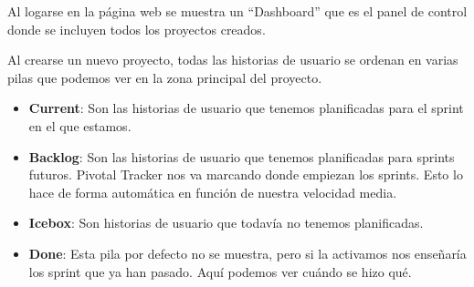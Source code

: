 \documentclass[a4paper, 12pt]{book}
\begin{document}
Al logarse en la p\'agina web se muestra un ``Dashboard'' que es el panel de control donde se incluyen todos los proyectos creados.

Al crearse un nuevo proyecto, todas las historias de usuario se ordenan en varias pilas que podemos ver en la zona principal del proyecto.
\begin{itemize}
  \item {\bfseries Current}: Son las historias de usuario que tenemos planificadas para el sprint en el que estamos.
  \item {\bfseries Backlog}: Son las historias de usuario que tenemos planificadas para sprints futuros. Pivotal Tracker nos va marcando 
  donde empiezan los sprints. Esto lo hace de forma autom\'atica en funci\'on de nuestra velocidad media.
  \item {\bfseries Icebox}: Son historias de usuario que todav\'ia no tenemos planificadas.
  \item {\bfseries Done}: Esta pila por defecto no se muestra, pero si la activamos nos ense\~nar\'ia los sprint que ya han pasado. Aqu\'i podemos ver cu\'ando se 
  hizo qu\'e. 
\end{itemize}
\end{document}
